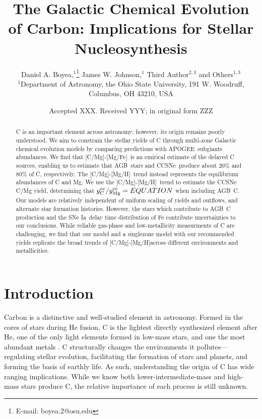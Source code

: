 \documentclass[fleqn,usenatbib]{mnras}
\title[The Origin and Galactic Evolution of Carbon]{The Galactic Chemical Evolution of Carbon: Implications for Stellar Nucleosynthesis }
\author[D. A. Boyea et. al.]{
Daniel A. Boyea,$^{1}$\thanks{E-mail: boyea.2@osu.edu}
James W. Johnson,$^{1}$
Third Author$^{2,3}$
and Others$^{1,3}$
\\
$^{1}$Department of Astronomy, the Ohio State University, 191 W. Woodruff, Columbus, OH 43210, USA
}
\date{Accepted XXX. Received YYY; in original form ZZZ}
\newcommand{\agb}{AGB}
\newcommand{\apogee}{APOGEE}
\newcommand{\cc}{CCSNe}
\newcommand{\ia}{SNe Ia}
\newcommand{\caah}{[C/Mg]-[Mg/H]}
\newcommand{\caafe}{[C/Mg]-[Mg/Fe]}
\newcommand{\Ycc}{\ensuremath{y_{\rm C}^{\rm cc}}}
\newcommand{\Yoc}{\ensuremath{y_{\rm Mg}^{\rm cc}}}
\begin{document}
\label{firstpage}
\pagerange{\pageref{firstpage}--\pageref{lastpage}}
\maketitle



\begin{abstract}
C is an important element across astronomy; however, its origin remains poorly understood. 
% 
We aim to constrain the stellar yields of C through multi-zone Galactic chemical evolution models by comparing predictions with \apogee\ subgiants abundances.
% 
We find that \caafe\ is an emirical estimate of the delayed C sources, enabling us to estimate that \agb\ stars and \cc\ produce about 20\% and 80\% of C, respectively.  
The \caah\ trend instead represents the equilibrium abundances of C and Mg. 
We use the \caah\ trend to estimate the CCSNe C/Mg yield, determining that  $\Ycc/\Yoc = EQUATION$ when including \agb\ C. 
Our models are relatively independent of uniform scaling of yields and outflows, and alternate star formation histories. 
However, the stars which contribute to \agb\ C production and the \ia\ delay time distribution of Fe contribute uncertainties to our conclusions. 
While reliable gas-phase and low-metallicity measurments of C are challenging, we find that our model and a singlezone model with our recommended yields replicate the broad trends of \caah across different environments and metallicities. 

\end{abstract}







\section{Introduction}

Carbon is a distinctive and well-studied element in astronomy. 
Formed in the cores of stars during He fusion, C is the lightest directly synthesized element after He, one of the only light elements formed in low-mass stars, and one the most abundant metals \citep[e.g.][]{jennifer19, KL14}.\footnotemark{}
C structurally changes the environments it pollutes---regulating stellar evolution, facilitating the formation of stars and planets, and forming the basis of earthly life.
As such, understanding the origin of C has wide ranging implications. 
While we know both lower-intermediate-mass and high-mass stars produce C, the relative importance of each process is still unknown.
\end{document}

